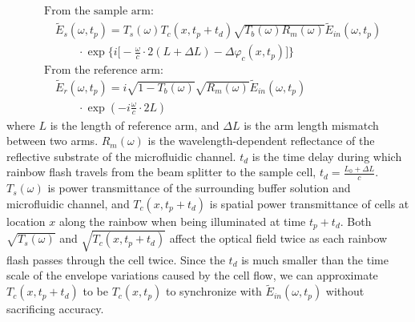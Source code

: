 \documentclass[aps,pra,reprint,longbibliography,superscriptaddress]{revtex4-1}
\begin{document}
\begin{equation}
\begin{split}
&\text{From the sample arm:}\\
&\quad \tilde{E}_s(\omega, t_p) = T_s(\omega) T_c(x,t_p + t_d) \sqrt{T_b(\omega) R_m(\omega)} \tilde{E}_{in}(\omega, t_p) \\
&\quad\quad\quad \cdot \exp \Big\lbrace i\Big[-\frac{\omega}{c} \cdot 2(L+\Delta L) - \Delta\varphi_c(x,t_p)\Big] \Big\rbrace\\
&\text{From the reference arm:} \\
&\quad \tilde{E}_r(\omega, t_p) = i \sqrt{1-T_b(\omega)} \sqrt{R_m(\omega)} \tilde{E}_{in}(\omega, t_p) \\
&\quad\quad\quad \cdot \exp(- i \frac{\omega}{c}\cdot 2L)
\end{split}
\end{equation}
where $L$ is the length of reference arm, and $\Delta L$ is the arm length mismatch between two arms. $R_m(\omega)$ is the wavelength-dependent reflectance of the reflective substrate of the microfluidic channel. $t_d$ is the time delay during which rainbow flash travels from the beam splitter to the sample cell, $t_d = \frac{L_0 + \Delta L}{c}$. $T_s(\omega)$ is power transmittance of the surrounding buffer solution and microfluidic channel, and $T_c(x,t_p + t_d)$ is spatial power transmittance of cells at location $x$ along the rainbow when being illuminated at time $t_p + t_d$. Both $\sqrt{T_s(\omega)}$ and $\sqrt{T_c(x,t_p + t_d)}$ affect the optical field twice as each rainbow flash passes through the cell twice. Since the $t_d$ is much smaller than the time scale of the envelope variations caused by the cell flow, we can approximate $T_c(x,t_p + t_d)$ to be $T_c(x,t_p)$ to synchronize with $\tilde{E}_{in}(\omega, t_p)$ without sacrificing accuracy.
\end{document}

